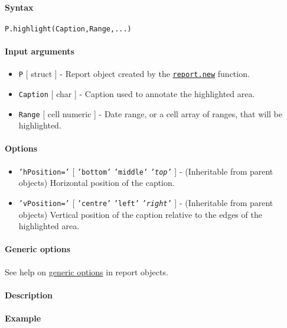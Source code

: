 


	\paragraph{Syntax}\label{syntax}

\begin{verbatim}
P.highlight(Caption,Range,...)
\end{verbatim}

\paragraph{Input arguments}\label{input-arguments}

\begin{itemize}
\item
  \texttt{P} {[} struct {]} - Report object created by the
  \href{report/new}{\texttt{report.new}} function.
\item
  \texttt{Caption} {[} char {]} - Caption used to annotate the
  highlighted area.
\item
  \texttt{Range} {[} cell \textbar{} numeric {]} - Date range, or a cell
  array of ranges, that will be highlighted.
\end{itemize}

\paragraph{Options}\label{options}

\begin{itemize}
\item
  \texttt{'hPosition='} {[} \texttt{'bottom'} \textbar{}
  \texttt{'middle'} \textbar{} \emph{\texttt{'top'}} {]} - (Inheritable
  from parent objects) Horizontal position of the caption.
\item
  \texttt{'vPosition='} {[} \texttt{'centre'} \textbar{} \texttt{'left'}
  \textbar{} \emph{\texttt{'right'}} {]} - (Inheritable from parent
  objects) Vertical position of the caption relative to the edges of the
  highlighted area.
\end{itemize}

\paragraph{Generic options}\label{generic-options}

See help on \href{report/Contents}{generic options} in report objects.

\paragraph{Description}\label{description}

\paragraph{Example}\label{example}



